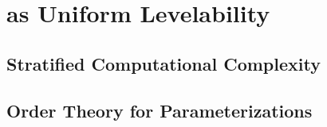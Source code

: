 \section{as Uniform Levelability}

\subsection{Stratified Computational Complexity}

\subsection{Order Theory for Parameterizations}
